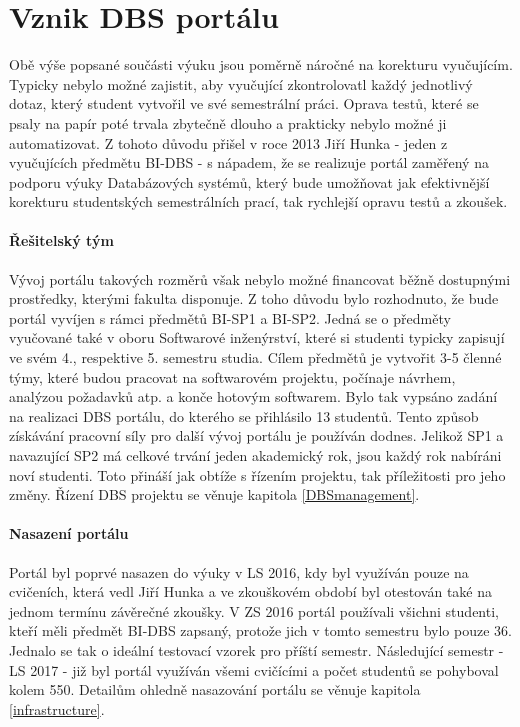\section{Vznik DBS portálu} \label{DBSportal:creation}
Obě výše popsané součásti výuku jsou poměrně náročné na korekturu vyučujícím. Typicky nebylo možné zajistit, aby vyučující zkontrolovatl každý jednotlivý dotaz, který student vytvořil ve své semestrální práci. Oprava testů, které se psaly na papír poté trvala zbytečně dlouho a prakticky nebylo možné ji automatizovat. Z tohoto důvodu přišel v roce 2013 Jiří Hunka - jeden z vyučujících předmětu BI-DBS - s nápadem, že se realizuje portál zaměřený na podporu výuky Databázových systémů, který bude umožňovat jak efektivnější korekturu studentských semestrálních prací, tak rychlejší opravu testů a zkoušek.

\paragraph{Řešitelský tým}
Vývoj portálu takových rozměrů však nebylo možné financovat běžně dostupnými prostředky, kterými fakulta disponuje. Z toho důvodu bylo rozhodnuto, že bude portál vyvíjen s rámci předmětů BI-SP1 a BI-SP2. Jedná se o předměty vyučované také v oboru Softwarové inženýrství, které si studenti typicky zapisují ve svém 4., respektive 5. semestru studia. Cílem předmětů je vytvořit 3-5 členné týmy, které budou pracovat na softwarovém projektu, počínaje návrhem, analýzou požadavků atp. a konče hotovým softwarem. Bylo tak vypsáno zadání na realizaci DBS portálu, do kterého se přihlásilo 13 studentů.
Tento způsob získávání pracovní síly pro další vývoj portálu je používán dodnes. Jelikož SP1 a navazující SP2 má celkové trvání jeden akademický rok, jsou každý rok nabíráni noví studenti. Toto přináší jak obtíže s řízením projektu, tak příležitosti pro jeho změny. Řízení DBS projektu se věnuje kapitola \ref{DBSmanagement}.

\paragraph{Nasazení portálu}
Portál byl poprvé nasazen do výuky v LS 2016, kdy byl využíván pouze na cvičeních, která vedl Jiří Hunka a ve zkouškovém období byl otestován také na jednom termínu závěrečné zkoušky.
V ZS 2016 portál používali všichni studenti, kteří měli předmět BI-DBS zapsaný, protože jich v tomto semestru bylo pouze 36. Jednalo se tak o ideální testovací vzorek pro příští semestr. Následující semestr - LS 2017 - již byl portál využíván všemi cvičícími a počet studentů se pohyboval kolem 550. Detailům ohledně nasazování portálu se věnuje kapitola \ref{infrastructure}.

